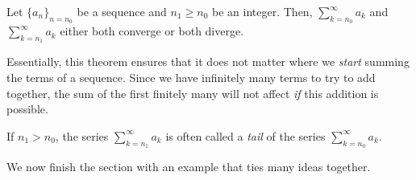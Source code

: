 \documentclass{ximera}
\begin{document}
\begin{theorem}
  Let $\{a_n\}_{n=n_0}$ be a sequence and $n_1 \geq n_0$ be an integer.  Then, $\sum_{k=n_0}^{\infty} a_k$ and $\sum_{k=n_1}^{\infty} a_k$ either both converge or both diverge.
\end{theorem}

Essentially, this theorem ensures that it does not matter where we \emph{start} summing the terms of a sequence.  Since we have infinitely many terms to try to add together, the sum of the first finitely many will not affect \emph{if} this addition is possible.

\begin{remark}
If $n_1>n_0$, the series $\sum_{k=n_1}^{\infty} a_k$ is often called a \emph{tail} of the series $\sum_{k=n_0}^{\infty} a_k$.
\end{remark}

We now finish the section with an example that ties many ideas together.
\end{document}
